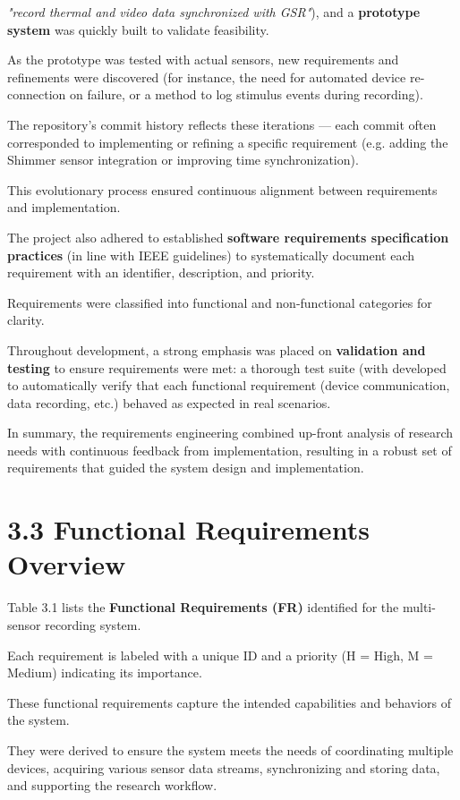 \textit{"record thermal and video data synchronized with GSR"}), and a \textbf{prototype system}
 was quickly built to validate feasibility.

As the prototype was tested with actual sensors, new requirements and refinements
were discovered (for instance, the need for automated device re-connection on
failure, or a method to log stimulus events during recording).

The repository's commit history reflects these iterations --- each commit often
corresponded to implementing or refining a specific requirement (e.g.  adding the
Shimmer sensor integration or improving time synchronization).

This evolutionary process ensured continuous alignment between requirements and
implementation.

The project also adhered to established \textbf{software requirements specification
practices}
 (in line with IEEE guidelines) to systematically document each requirement with an
 identifier, description, and priority.

Requirements were classified into functional and non-functional categories for
clarity.

Throughout development, a strong emphasis was placed on \textbf{validation and
testing}
 to ensure requirements were met: a thorough test suite (with %
 developed to automatically verify that each functional requirement (device
 communication, data recording, etc.) behaved as expected in real scenarios.

In summary, the requirements engineering combined up-front analysis of research needs
with continuous feedback from implementation, resulting in a robust set of
requirements that guided the system design and implementation.

\section{3.3 Functional Requirements Overview}

Table 3.1 lists the \textbf{Functional Requirements (FR)}
 identified for the multi-sensor recording system.

Each requirement is labeled with a unique ID and a priority (H = High, M = Medium)
indicating its importance.

These functional requirements capture the intended capabilities and behaviors of the
system.

They were derived to ensure the system meets the needs of coordinating multiple
devices, acquiring various sensor data streams, synchronizing and storing data, and
supporting the research workflow.

